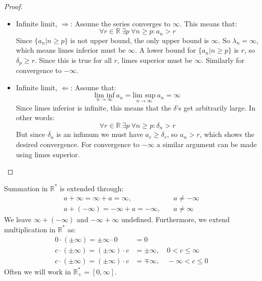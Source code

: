 \documentclass[12pt, a4paper]{article}
\numberwithin{equation}{section}
\begin{document}
\begin{proof}
\begin{itemize}
\item Infinite limit, $\Rightarrow$: Assume the series converges to $\infty$. This means that:
\begin{equation}
\forall r\in\mathbb{R}\ \exists p\ \forall n\ge p: a_n>r
\end{equation}
Since $\{a_n|n\ge p\}$ is not upper bound, the only upper bound is $\infty$. So $\lambda_n=\infty$, which means limes inferior must be $\infty$. A lower bound for $\{a_n|n\ge p\}$ is $r$, so $\delta_p\ge r$. Since this is true for all $r$, limes superior must be $\infty$. Similarly for convergence to $-\infty$.
\item Infinite limit, $\Leftarrow$: Assume that:
\begin{equation}
\underset{n\rightarrow\infty}{\textrm{lim inf}}\ a_n=\underset{n\rightarrow\infty}{\textrm{lim sup}}\ a_n=\infty
\end{equation}
Since limes inferior is infinite, this means that the $\delta$'s get arbitrarily large. In other words:
\begin{equation}
\forall r\in\mathbb{R}\ \exists p\ \forall n\ge p:\delta_n>r
\end{equation}
But since $\delta_n$ is an infimum we must have $a_r\ge\delta_r$, so $a_n>r$, which shows the desired convergence. For convergence to $-\infty$ a similar argument can be made using limes superior.
\end{itemize}
\end{proof}

Summation in $\mathbb{R}^*$ is extended through:
\begin{align}
a+\infty = \infty+a = \infty,\quad & a\neq -\infty\\
a+(-\infty)=-\infty + a = -\infty,\quad & a\neq\infty
\end{align}
We leave $\infty+(-\infty)$ and $-\infty+\infty$ undefined. Furthermore, we extend multiplication in $\mathbb{R}^*$ as:
\begin{align}
0\cdot(\pm\infty)=\pm\infty\cdot 0&= 0\\
c\cdot(\pm\infty)=(\pm\infty)\cdot c &=\pm\infty,\quad 0<c\le\infty\\
c\cdot(\pm\infty)=(\pm\infty)\cdot c &=\mp\infty,\quad -\infty<c\le 0
\end{align}
Often we will work in $\mathbb{R}_+^*=[0,\infty]$.
\end{document}
